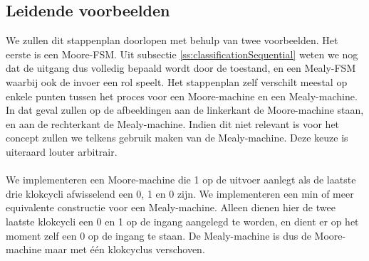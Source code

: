 \subsection{Leidende voorbeelden}
We zullen dit stappenplan doorlopen met behulp van twee voorbeelden. Het eerste is een Moore-FSM. Uit subsectie \ref{ss:classificationSequential} weten we nog dat de uitgang dus volledig bepaald wordt door de toestand, en een Mealy-FSM waarbij ook de invoer een rol speelt. Het stappenplan zelf verschilt meestal op enkele punten tussen het proces voor een Moore-machine en een Mealy-machine. In dat geval zullen op de afbeeldingen aan de linkerkant de Moore-machine staan, en aan de rechterkant de Mealy-machine. Indien dit niet relevant is voor het concept zullen we telkens gebruik maken van de Mealy-machine. Deze keuze is uiteraard louter arbitrair.
\paragraph{}
We implementeren een Moore-machine die 1 op de uitvoer aanlegt als de laatste drie klokcycli afwisselend een 0, 1 en 0 zijn. We implementeren een min of meer equivalente constructie voor een Mealy-machine. Alleen dienen hier de twee laatste klokcycli een 0 en 1 op de ingang aangelegd te worden, en dient er op het moment zelf een 0 op de ingang te staan. De Mealy-machine is dus de Moore-machine maar met \'e\'en klokcyclus verschoven.
